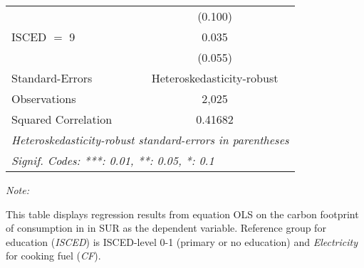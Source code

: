 \begin{table}[htbp!]
\begin{adjustbox}{width = 1\textwidth, max height = 0.95\textheight, center}
\begin{threeparttable}[b]
\begin{tabular}{lc}
                                & (0.100)\\   
            ISCED $=$ 9         & 0.035\\   
                                & (0.055)\\   
            \midrule 
            Standard-Errors     & Heteroskedasticity-robust \\   
            Observations        & 2,025\\  
            Squared Correlation & 0.41682\\  
            \midrule \midrule
            \multicolumn{2}{l}{\emph{Heteroskedasticity-robust standard-errors in parentheses}}\\
            \multicolumn{2}{l}{\emph{Signif. Codes: ***: 0.01, **: 0.05, *: 0.1}}\\
         \end{tabular}
         
         \begin{tablenotes}\item \medskip \textit{Note:}
            \item This table displays regression results from equation OLS on the carbon footprint of consumption in  in SUR as the dependent variable.  Reference group for education (\textit{ISCED}) is ISCED-level 0-1 (primary or no education) and \textit{Electricity} for cooking fuel (\textit{CF}).
         \end{tablenotes}
      \end{threeparttable}
   \end{adjustbox}
\end{table}


